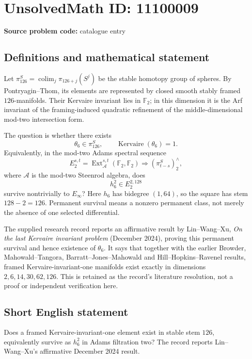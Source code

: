 \documentclass[11pt]{article}
\newcommand{\F}{\mathbb{F}}
\begin{document}
\section*{UnsolvedMath ID: 11100009}
\textbf{Source problem code:} catalogue entry
\subsection{Definitions and mathematical statement}
Let \(\pi_{126}^S=\operatorname*{colim}_{j}\pi_{126+j}(S^j)\) be the stable homotopy group of spheres. By Pontryagin--Thom, its elements are represented by closed smooth stably framed \(126\)-manifolds. Their Kervaire invariant lies in \(\F_2\); in this dimension it is the Arf invariant of the framing-induced quadratic refinement of the middle-dimensional mod-two intersection form.

The question is whether there exists
\[\theta_6\in\pi_{126}^S,\qquad\operatorname{Kervaire}(\theta_6)=1.\]
Equivalently, in the mod-two Adams spectral sequence
\[E_2^{s,t}=\operatorname{Ext}_{\mathcal A}^{s,t}(\F_2,\F_2)\Longrightarrow(\pi_{t-s}^S)^\wedge_2,\]
where \(\mathcal A\) is the mod-two Steenrod algebra, does
\[h_6^2\in E_2^{2,128}\]
survive nontrivially to \(E_\infty\)? Here \(h_6\) has bidegree \((1,64)\), so the square has stem \(128-2=126\). Permanent survival means a nonzero permanent class, not merely the absence of one selected differential.

The supplied research record reports an affirmative result by Lin--Wang--Xu, \emph{On the last Kervaire invariant problem} (December 2024), proving this permanent survival and hence existence of \(\theta_6\). It says that together with the earlier Browder, Mahowald--Tangora, Barratt--Jones--Mahowald and Hill--Hopkins--Ravenel results, framed Kervaire-invariant-one manifolds exist exactly in dimensions \(2,6,14,30,62,126\). This is retained as the record's literature resolution, not a proof or independent verification here.
\subsection{Short English statement}
Does a framed Kervaire-invariant-one element exist in stable stem \(126\), equivalently survive as \(h_6^2\) in Adams filtration two? The record reports Lin--Wang--Xu's affirmative December 2024 result.
\end{document}
